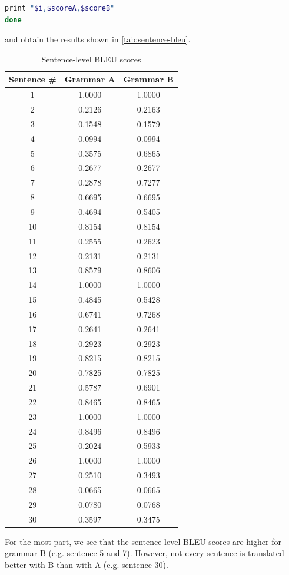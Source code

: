 \documentclass[a4paper,oneside,reqno]{amsart}
\begin{document}
\begin{enumerate}[label=\arabic*.]
\begin{lstlisting}[language=bash]
  print "$i,$scoreA,$scoreB"
done
    \end{lstlisting}
    and obtain the results shown in \autoref{tab:sentence-bleu}.
    \begin{table}[ht!]
      \begin{tabular}{ccc}
        \toprule
        Sentence \# & Grammar A & Grammar B \\
        \midrule
        1 & 1.0000 & 1.0000 \\
        2 & 0.2126 & 0.2163 \\
        3 & 0.1548 & 0.1579 \\
        4 & 0.0994 & 0.0994 \\
        5 & 0.3575 & 0.6865 \\
        6 & 0.2677 & 0.2677 \\
        7 & 0.2878 & 0.7277 \\
        8 & 0.6695 & 0.6695 \\
        9 & 0.4694 & 0.5405 \\
        10 & 0.8154 & 0.8154 \\
        11 & 0.2555 & 0.2623 \\
        12 & 0.2131 & 0.2131 \\
        13 & 0.8579 & 0.8606 \\
        14 & 1.0000 & 1.0000 \\
        15 & 0.4845 & 0.5428 \\
        16 & 0.6741 & 0.7268 \\
        17 & 0.2641 & 0.2641 \\
        18 & 0.2923 & 0.2923 \\
        19 & 0.8215 & 0.8215 \\
        20 & 0.7825 & 0.7825 \\
        21 & 0.5787 & 0.6901 \\
        22 & 0.8465 & 0.8465 \\
        23 & 1.0000 & 1.0000 \\
        24 & 0.8496 & 0.8496 \\
        25 & 0.2024 & 0.5933 \\
        26 & 1.0000 & 1.0000 \\
        27 & 0.2510 & 0.3493 \\
        28 & 0.0665 & 0.0665 \\
        29 & 0.0780 & 0.0768 \\
        30 & 0.3597 & 0.3475 \\
        \bottomrule
      \end{tabular}
      \caption{Sentence-level BLEU scores}
      \label{tab:sentence-bleu}
    \end{table}
    For the most part, we see that the sentence-level BLEU scores are higher
    for grammar B (e.g. sentence 5 and 7). However, not every sentence is
    translated better with B than with A (e.g. sentence 30).


\end{enumerate}
\end{document}

